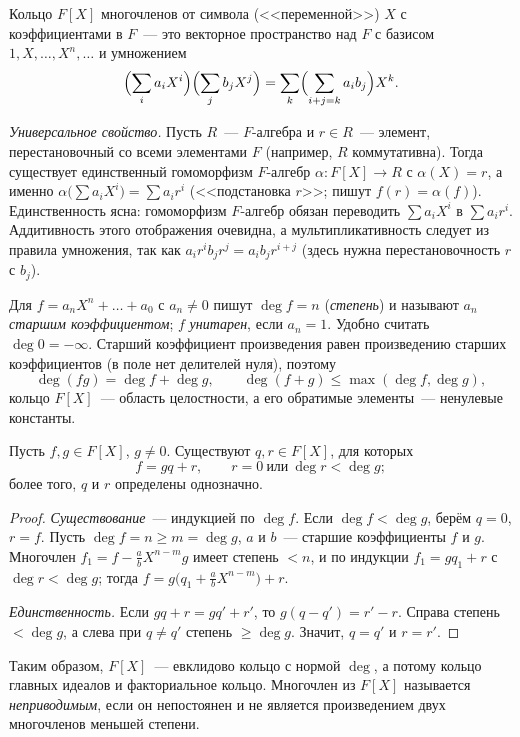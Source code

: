 \begin{definition}[1.5]
Кольцо $F[X]$ многочленов от символа (<<переменной>>) $X$ с коэффициентами в $F$~--- это векторное пространство над $F$
с базисом $1,X,\dots,X^n,\dots$ и умножением
\[
\Bigl(\sum_ia_iX^i\Bigr)\Bigl(\sum_jb_jX^j\Bigr)=\sum_k\Bigl(\sum_{i+j=k}a_ib_j\Bigr)X^k.
\]
\end{definition}

\emph{Универсальное свойство.} Пусть $R$~--- $F$-алгебра и $r\in R$~--- элемент, перестановочный со всеми элементами $F$
(например, $R$ коммутативна). Тогда существует единственный гомоморфизм $F$-алгебр $\alpha\colon F[X]\to R$ с
$\alpha(X)=r$, а именно $\alpha\bigl(\sum a_iX^i\bigr)=\sum a_ir^i$ (<<подстановка $r$>>; пишут $f(r)=\alpha(f)$).
Единственность ясна: гомоморфизм $F$-алгебр обязан переводить $\sum a_iX^i$ в $\sum a_ir^i$. Аддитивность этого отображения
очевидна, а мультипликативность следует из правила умножения, так как $a_ir^ib_jr^j=a_ib_jr^{i+j}$ (здесь нужна
перестановочность $r$ с $b_j$).

Для $f=a_nX^n+\dots+a_0$ с $a_n\ne0$ пишут $\deg f=n$ (\emph{степень}) и называют $a_n$ \emph{старшим коэффициентом};
$f$ \emph{унитарен}, если $a_n=1$. Удобно считать $\deg0=-\infty$. Старший коэффициент произведения равен произведению
старших коэффициентов (в поле нет делителей нуля), поэтому
\[
\deg(fg)=\deg f+\deg g,\qquad \deg(f+g)\le\max(\deg f,\deg g),
\]
кольцо $F[X]$~--- область целостности, а его обратимые элементы~--- ненулевые константы.

\begin{proposition}
Пусть $f,g\in F[X]$, $g\ne0$. Существуют $q,r\in F[X]$, для которых
\[
f=gq+r,\qquad r=0\ \text{или}\ \deg r<\deg g;
\]
более того, $q$ и $r$ определены однозначно.
\end{proposition}

\begin{proof}
\emph{Существование}~--- индукцией по $\deg f$. Если $\deg f<\deg g$, берём $q=0$, $r=f$. Пусть $\deg f=n\ge m=\deg g$,
$a$ и $b$~--- старшие коэффициенты $f$ и $g$. Многочлен $f_1=f-\frac ab X^{n-m}g$ имеет степень $<n$, и по индукции
$f_1=gq_1+r$ с $\deg r<\deg g$; тогда $f=g\bigl(q_1+\frac abX^{n-m}\bigr)+r$.

\emph{Единственность.} Если $gq+r=gq'+r'$, то $g(q-q')=r'-r$. Справа степень $<\deg g$, а слева при $q\ne q'$ степень
$\ge\deg g$. Значит, $q=q'$ и $r=r'$.
\end{proof}

Таким образом, $F[X]$~--- евклидово кольцо с нормой $\deg$, а потому кольцо главных идеалов и факториальное кольцо.
Многочлен из $F[X]$ называется \emph{неприводимым}, если он непостоянен и не является произведением двух многочленов
меньшей степени.


